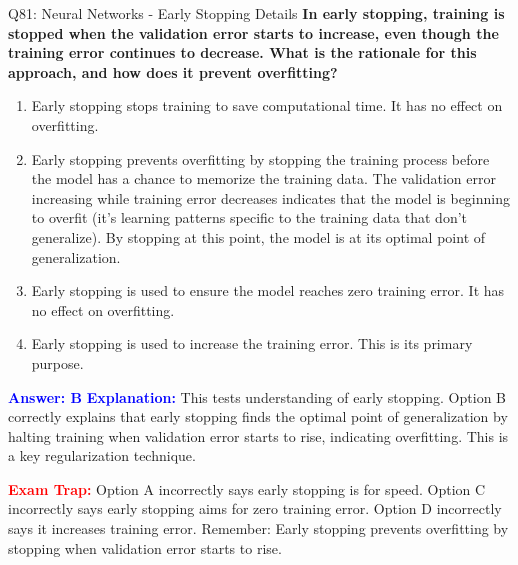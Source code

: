 \documentclass[8pt]{beamer}
\begin{document}
	\begin{frame}{Q81: Neural Networks - Early Stopping Details}
		\fontsize{6.5}{7.5}\selectfont\textbf{In early stopping, training is stopped when the validation error starts to increase, even though the training error continues to decrease. What is the rationale for this approach, and how does it prevent overfitting?}
		
		\begin{enumerate}
			\item Early stopping stops training to save computational time. It has no effect on overfitting.
			\item Early stopping prevents overfitting by stopping the training process before the model has a chance to memorize the training data. The validation error increasing while training error decreases indicates that the model is beginning to overfit (it's learning patterns specific to the training data that don't generalize). By stopping at this point, the model is at its optimal point of generalization.
			\item Early stopping is used to ensure the model reaches zero training error. It has no effect on overfitting.
			\item Early stopping is used to increase the training error. This is its primary purpose.
		\end{enumerate}
		
		\vspace{0.1cm}
		\textcolor{blue}{\textbf{Answer: B}}
		\vspace{0.1cm}
		\textcolor{blue}{\textbf{Explanation:}} This tests understanding of early stopping. Option B correctly explains that early stopping finds the optimal point of generalization by halting training when validation error starts to rise, indicating overfitting. This is a key regularization technique.
		
		\textcolor{red}{\textbf{Exam Trap:}} Option A incorrectly says early stopping is for speed. Option C incorrectly says early stopping aims for zero training error. Option D incorrectly says it increases training error. Remember: Early stopping prevents overfitting by stopping when validation error starts to rise.
	\end{frame}
	
\end{document}
